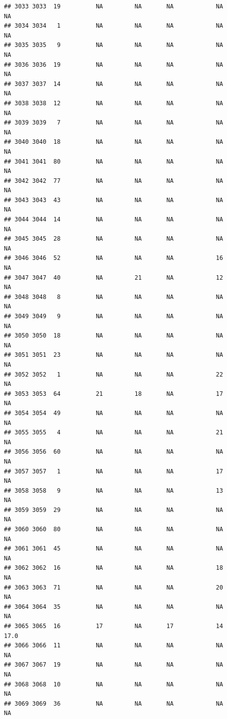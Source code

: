 \documentclass[man]{apa6}
\begin{document}
\begin{verbatim}
## 3033 3033  19          NA         NA       NA            NA       NA
## 3034 3034   1          NA         NA       NA            NA       NA
## 3035 3035   9          NA         NA       NA            NA       NA
## 3036 3036  19          NA         NA       NA            NA       NA
## 3037 3037  14          NA         NA       NA            NA       NA
## 3038 3038  12          NA         NA       NA            NA       NA
## 3039 3039   7          NA         NA       NA            NA       NA
## 3040 3040  18          NA         NA       NA            NA       NA
## 3041 3041  80          NA         NA       NA            NA       NA
## 3042 3042  77          NA         NA       NA            NA       NA
## 3043 3043  43          NA         NA       NA            NA       NA
## 3044 3044  14          NA         NA       NA            NA       NA
## 3045 3045  28          NA         NA       NA            NA       NA
## 3046 3046  52          NA         NA       NA            16       NA
## 3047 3047  40          NA         21       NA            12       NA
## 3048 3048   8          NA         NA       NA            NA       NA
## 3049 3049   9          NA         NA       NA            NA       NA
## 3050 3050  18          NA         NA       NA            NA       NA
## 3051 3051  23          NA         NA       NA            NA       NA
## 3052 3052   1          NA         NA       NA            22       NA
## 3053 3053  64          21         18       NA            17       NA
## 3054 3054  49          NA         NA       NA            NA       NA
## 3055 3055   4          NA         NA       NA            21       NA
## 3056 3056  60          NA         NA       NA            NA       NA
## 3057 3057   1          NA         NA       NA            17       NA
## 3058 3058   9          NA         NA       NA            13       NA
## 3059 3059  29          NA         NA       NA            NA       NA
## 3060 3060  80          NA         NA       NA            NA       NA
## 3061 3061  45          NA         NA       NA            NA       NA
## 3062 3062  16          NA         NA       NA            18       NA
## 3063 3063  71          NA         NA       NA            20       NA
## 3064 3064  35          NA         NA       NA            NA       NA
## 3065 3065  16          17         NA       17            14     17.0
## 3066 3066  11          NA         NA       NA            NA       NA
## 3067 3067  19          NA         NA       NA            NA       NA
## 3068 3068  10          NA         NA       NA            NA       NA
## 3069 3069  36          NA         NA       NA            NA       NA

\end{verbatim}
\end{document}
